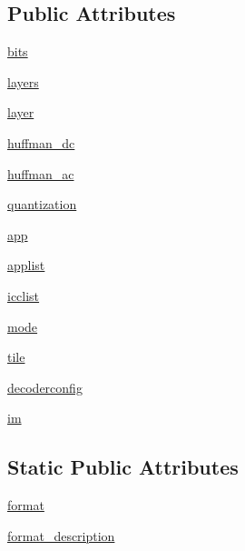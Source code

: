 \subsection*{Public Attributes}
\begin{DoxyCompactItemize}
\item 
\hyperlink{classPIL_1_1JpegImagePlugin_1_1JpegImageFile_aabd260db66dae083aa61326eae165abd}{bits}
\item 
\hyperlink{classPIL_1_1JpegImagePlugin_1_1JpegImageFile_a91e9caff2ff15f07e5d08c08b8c42a0a}{layers}
\item 
\hyperlink{classPIL_1_1JpegImagePlugin_1_1JpegImageFile_a9c64c23e28a5be26e3152be0ad1e9fe0}{layer}
\item 
\hyperlink{classPIL_1_1JpegImagePlugin_1_1JpegImageFile_a875c4ea243ee510d54d004ce630932a0}{huffman\+\_\+dc}
\item 
\hyperlink{classPIL_1_1JpegImagePlugin_1_1JpegImageFile_a8af79f6fc793ac7cdd75bc46cf9f1409}{huffman\+\_\+ac}
\item 
\hyperlink{classPIL_1_1JpegImagePlugin_1_1JpegImageFile_a5b90b062aaac631d9696f6ab3686060c}{quantization}
\item 
\hyperlink{classPIL_1_1JpegImagePlugin_1_1JpegImageFile_af078d77e44bde0ed8387456771f3b1c4}{app}
\item 
\hyperlink{classPIL_1_1JpegImagePlugin_1_1JpegImageFile_a3da557f7ea24c32806fe9f73da3687a2}{applist}
\item 
\hyperlink{classPIL_1_1JpegImagePlugin_1_1JpegImageFile_ab688cb9fc65ef2340e00c581b22ae274}{icclist}
\item 
\hyperlink{classPIL_1_1JpegImagePlugin_1_1JpegImageFile_ac7dd31a8f7e9484358372ded5a42477a}{mode}
\item 
\hyperlink{classPIL_1_1JpegImagePlugin_1_1JpegImageFile_ac16b353bf51d93072c0857c32733b0ad}{tile}
\item 
\hyperlink{classPIL_1_1JpegImagePlugin_1_1JpegImageFile_a1e9bd2922edab426a423aee1dda3c0be}{decoderconfig}
\item 
\hyperlink{classPIL_1_1JpegImagePlugin_1_1JpegImageFile_a06b74a92d07b8cad54f45f8f16f39adf}{im}
\end{DoxyCompactItemize}
\subsection*{Static Public Attributes}
\begin{DoxyCompactItemize}
\item 
\hyperlink{classPIL_1_1JpegImagePlugin_1_1JpegImageFile_addb2baa947928e747a3f50332f8df3b4}{format}
\item 
\hyperlink{classPIL_1_1JpegImagePlugin_1_1JpegImageFile_a43b5b854d40475f6d4f8debcbd2fd8b2}{format\+\_\+description}
\end{DoxyCompactItemize}



